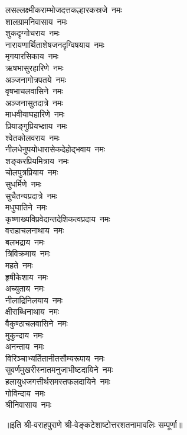 \begin{multicols}{2}
\begin{flushleft}
लसल्लक्ष्मीकराम्भोजदत्त\-कल्हारकस्रजे~नमः\\
शालग्रामनिवासाय~नमः\\
शुकदृग्गोचराय~नमः\\
नारायणार्थिताशेषजन\-दृग्विषयाय~नमः\\
मृगयारसिकाय~नमः\\
ऋषभासुरहारिणे~नमः\hfill{}\\
अञ्जनागोत्रपतये~नमः\\
वृषभाचलवासिने~नमः\\
अञ्जनासुतदात्रे~नमः\\
माधवीयाघहारिणे~नमः\\
प्रियाङ्गुप्रियभ्क्षाय~नमः\\
श्वेतकोलवराय~नमः\\
नीलधेनुपयोधारासेक\-देहोद्भवाय~नमः\\
शङ्करप्रियमित्राय~नमः\\
चोलपुत्रप्रियाय~नमः\\
सुधर्मिणे~नमः\hfill{}\\
सुचैतन्यप्रदात्रे~नमः\\
मधुघातिने~नमः\\
कृष्णाख्यविप्रवेदान्त\-देशिकत्व\-प्रदाय~नमः\\
वराहाचलनाथाय~नमः\\
बलभद्राय~नमः\\
त्रिविक्रमाय~नमः\\
महते~नमः\\
हृषीकेशाय~नमः\\
अच्युताय~नमः\\
नीलाद्रिनिलयाय~नमः\hfill{}\\
क्षीराब्धिनाथाय~नमः\\
वैकुण्ठाचलवासिने~नमः\\
मुकुन्दाय~नमः\\
अनन्ताय~नमः\\
विरिञ्चाभ्यर्तितानीत\-सौम्य\-रूपाय~नमः\\
सुवर्णमुखरीस्नातमनुजाभीष्ट\-दायिने~नमः\\
हलायुधजगत्तीर्थसमस्त\-फलदायिने~नमः\\
गोविन्दाय~नमः\\
श्रीनिवासाय~नमः\\
\end{flushleft}
\end{multicols}
॥इति श्री-वराहपुराणे श्री-वेङ्कटेशाष्टोत्तरशतनामावलिः सम्पूर्णा॥
